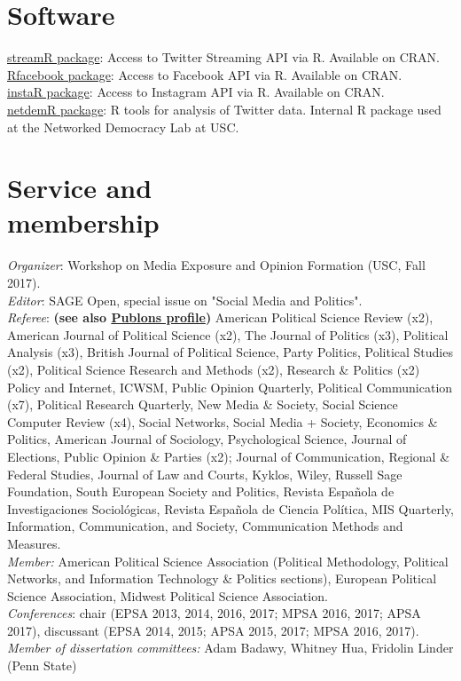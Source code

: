 \documentclass[margin,line,11pt]{resume}
\newcommand{\nl}{\vspace{0.10in}\\}
\begin{document}
\begin{resume}
        \section{\mysidestyle Software}
    
\href{http://cran.r-project.org/web/packages/streamR/}{streamR package}: Access to Twitter Streaming API via R. Available on CRAN. \nl
\href{http://cran.r-project.org/web/packages/Rfacebook/index.html}{Rfacebook package}: Access to Facebook API via R. Available on CRAN. \nl
\href{http://cran.r-project.org/web/packages/instaR/index.html}{instaR package}: Access to Instagram API via R. Available on CRAN. \nl
\href{https://github.com/netdem-USC/netdemR}{netdemR package}: R tools for analysis of Twitter data. Internal R package used at the Networked Democracy Lab at USC. 

                \section{\mysidestyle Service and\\membership}
\emph{Organizer}: Workshop on Media Exposure and Opinion Formation (USC, Fall 2017).\nl
\emph{Editor}: SAGE Open, special issue on "Social Media and Politics".\nl
\emph{Referee}: \textbf{(see also \href{https://publons.com/author/1291880/pablo-barbera}{Publons profile})} American Political Science Review (x2), American Journal of Political Science (x2), The Journal of Politics (x3), Political Analysis (x3), British Journal of Political Science, Party Politics, Political Studies (x2), Political Science Research and Methods (x2), Research \& Politics (x2) Policy and Internet, ICWSM, Public Opinion Quarterly, Political Communication (x7), Political Research Quarterly, New Media \& Society, Social Science Computer Review (x4), Social Networks, Social Media + Society, Economics \& Politics, American Journal of Sociology, Psychological Science, Journal of Elections, Public Opinion \& Parties (x2); Journal of Communication, Regional \& Federal Studies, Journal of Law and Courts, Kyklos, Wiley, Russell Sage Foundation, South European Society and Politics, Revista Espa\~{n}ola de Investigaciones Sociol\'{o}gicas, Revista Espa\~{n}ola de Ciencia Pol\'{i}tica, MIS Quarterly, Information, Communication, and Society, Communication Methods and Measures.\nl
\emph{Member:} American Political Science Association (Political Methodology, Political Networks, and Information Technology \& Politics sections), European Political Science Association, Midwest Political Science Association.\nl
\emph{Conferences}: chair (EPSA 2013, 2014, 2016, 2017; MPSA 2016, 2017; APSA 2017), discussant (EPSA 2014, 2015; APSA 2015, 2017; MPSA 2016, 2017).\nl
\emph{Member of dissertation committees:} Adam Badawy, Whitney Hua, Fridolin Linder (Penn State)  


\end{resume}
\end{document}
